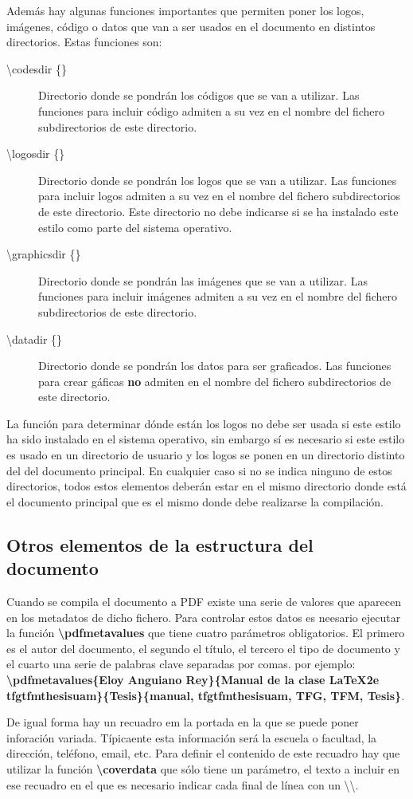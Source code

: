 Además hay algunas funciones importantes que permiten poner los logos, imágenes, código o datos que van a ser usados en el documento en distintos directorios.
Estas funciones son:
\begin{description}
\item [\textbackslash codesdir \{\}] Directorio donde se pondrán los códigos que se van a utilizar. Las funciones para incluir código admiten a su vez en el nombre del fichero subdirectorios de este directorio.
\item [\textbackslash logosdir \{\}] Directorio donde se pondrán los logos que se van a utilizar. Las funciones para incluir logos admiten a su vez en el nombre del fichero subdirectorios de este directorio. Este directorio no debe indicarse si se ha instalado este estilo como parte del sistema operativo.
\item [\textbackslash graphicsdir \{\}] Directorio donde se pondrán las imágenes que se van a utilizar. Las funciones para incluir imágenes admiten a su vez en el nombre del fichero subdirectorios de este directorio.
\item [\textbackslash datadir \{\} ]Directorio donde se pondrán los datos para ser graficados. Las funciones para crear gáficas \textbf{no} admiten en el nombre del fichero subdirectorios de este directorio.
\end{description}

 La función para determinar dónde están los logos no debe ser usada si este estilo ha sido instalado en el sistema operativo, sin embargo sí es necesario si este estilo es usado en un directorio de usuario y los logos se ponen en un directorio distinto del del documento principal. En cualquier caso si no se indica ninguno de estos directorios, todos estos elementos deberán estar en el mismo directorio donde está el documento principal que es el mismo donde debe realizarse la compilación.

\subsection{Otros elementos de la estructura del documento}

Cuando se compila el documento a PDF existe una serie de valores que aparecen en los metadatos de dicho fichero. Para controlar estos datos es neesario ejecutar la función \textbf{\textbackslash pdfmetavalues} que tiene cuatro parámetros obligatorios. El primero es el autor del documento, el segundo el título, el tercero el tipo de documento y el cuarto una serie de palabras clave separadas por comas. por ejemplo: \textbf{\textbackslash pdfmetavalues\{Eloy Anguiano Rey\}\{Manual de la clase LaTeX2e tfgtfmthesisuam\}\{Tesis\}\{manual, tfgtfmthesisuam, TFG, TFM, Tesis\}}.

De igual forma hay un recuadro em la portada en la que se puede poner inforación variada. Típicaente esta información será la escuela o facultad, la dirección, teléfono, email, etc. Para definir el contenido de este recuadro hay que utilizar la función \textbf{\textbackslash coverdata} que sólo tiene un parámetro, el texto a incluir en ese recuadro en el que es necesario indicar cada final de línea con un \textbackslash\textbackslash.
